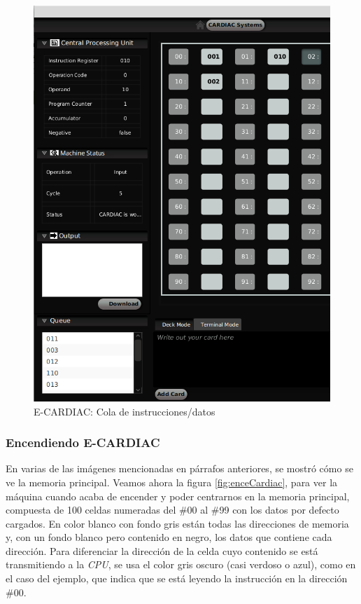 \documentclass[letterpaper,12pt,oneside]{book}
\begin{document}
	\begin{figure}[H]
 			\centering
			\includegraphics[scale=0.61]{media/ECARDIAC/QueueCargada.png}
			\caption{E-CARDIAC: Cola de instrucciones/datos}
			\label{fig:ecardiacQueue}
	\end{figure}		

 \subsubsection{Encendiendo E-CARDIAC}

	En varias de las imágenes mencionadas en párrafos anteriores, se mostró cómo se ve la memoria principal. Veamos ahora la figura 
	\ref{fig:enceCardiac}, para ver la máquina cuando acaba de encender y poder centrarnos en la memoria principal, compuesta de 100 celdas numeradas del \#00 al \#99 con los datos
	por defecto cargados. En color blanco con fondo gris están todas las direcciones de memoria y, con un fondo blanco pero
	contenido en negro, los datos que contiene cada dirección. Para diferenciar la dirección de la celda cuyo contenido se está transmitiendo a la \textit{CPU}, se usa el color gris oscuro (casi verdoso o azul), como en el caso del ejemplo, que indica que se está leyendo la instrucción en la dirección \#00.
	
\end{document}
